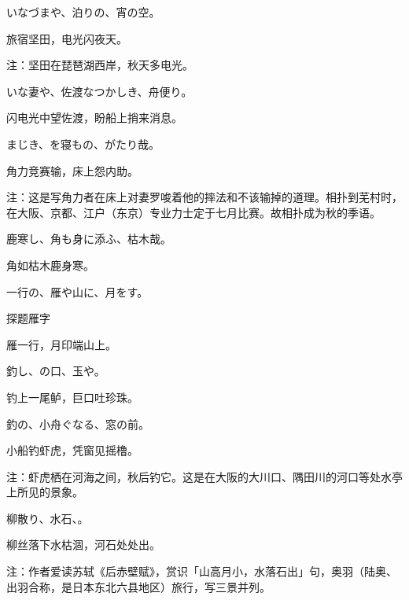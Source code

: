 \begin{haiku}
    {\FH いなづまや、泊りの、宵の空。}

    {\FK 旅宿坚田，电光闪夜天。}

    {\FT 注：坚田在琵琶湖西岸，秋天多电光。}
\end{haiku}

\begin{haiku}
    {\FH いな妻や、佐渡なつかしき、舟便り。}

    {\FK 闪电光中望佐渡，盼船上捎来消息。}
\end{haiku}

\begin{haiku}
    {\FH {}まじき、を寝もの、がたり哉。}

    {\FK 角力竞赛输，床上怨内助。}

    {\FT 注：这是写角力者在床上对妻罗唆着他的摔法和不该输掉的道理。相扑到芜村时，在大阪、京都、江户（东京）专业力士定于七月比赛。故相扑成为秋的季语。}
\end{haiku}

\begin{haiku}
    {\FH 鹿寒し、角も身に添ふ、枯木哉。}

    {\FK 角如枯木鹿身寒。}
\end{haiku}

\begin{haiku}
    {\FH 一行の、雁や山に、月をす。}

    {\FK 探题雁字}

    {\FK 雁一行，月印端山上。}
\end{haiku}

\begin{haiku}
    {\FH 釣し、の口、玉や。}

    {\FK 钓上一尾鲈，巨口吐珍珠。}
\end{haiku}

\begin{haiku}
    {\FH {}釣の、小舟ぐなる、窓の前。}

    {\FK 小船钓虾虎，凭窗见摇橹。}

    {\FT 注：虾虎栖在河海之间，秋后钓它。这是在大阪的大川口、隅田川的河口等处水亭上所见的景象。}
\end{haiku}

\begin{haiku}
    {\FH 柳散り、水石、。}

    {\FK 柳丝落下水枯涸，河石处处出。}

    {\FT 注：作者爱读苏轼《后赤壁赋》，赏识「山高月小，水落石出」句，奥羽（陆奥、出羽合称，是日本东北六县地区）旅行，写三景并列。}
\end{haiku}


